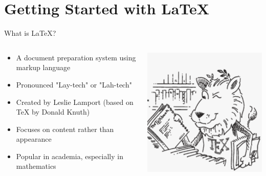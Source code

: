 
\section{Getting Started with LaTeX}

\begin{frame}{What is LaTeX?}
    \begin{columns}
        \begin{column}{0.6\textwidth}
            \begin{itemize}
                \item A document preparation system using markup language
                \item Pronounced "Lay-tech" or "Lah-tech"
                \item Created by Leslie Lamport (based on TeX by Donald Knuth)
                \item Focuses on \alert{content} rather than \alert{appearance}
                \item Popular in academia, especially in mathematics
            \end{itemize}
        \end{column}
        
        \begin{column}{0.4\textwidth}
                \includegraphics[width=0.7\linewidth]{figs/latex_logo}
        \end{column}
    \end{columns}
\end{frame}

